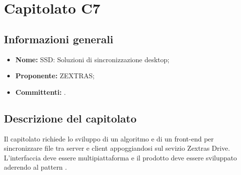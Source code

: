 \section{Capitolato C7}

\subsection{Informazioni generali}
\begin{itemize}
\item \textbf{Nome:} SSD: Soluzioni di sincronizzazione desktop;
\item \textbf{Proponente:} ZEXTRAS;
\item \textbf{Committenti:} \committenti{}.
\end{itemize}

\subsection{Descrizione del capitolato}
Il capitolato richiede lo sviluppo di un algoritmo e di un front-end per sincronizzare file tra server e client appoggiandosi sul sevizio Zextras Drive.
L'interfaccia deve essere multipiattaforma e il prodotto deve essere sviluppato aderendo al pattern .

